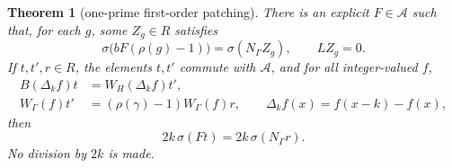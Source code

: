 \documentclass[11pt,a4paper]{article}
\newtheorem{theorem}{Theorem}[section]
\theoremstyle{definition}
\begin{document}
\begin{theorem}[one-prime first-order patching]
\label{thm:one-prime}
There is an explicit \(F\in\mathcal A\) such that,
for each \(g\), some \(Z_g\in R\) satisfies
\[
 \sigma\bigl(bF(\rho(g)-1)\bigr)
       =\sigma(N_\Gamma Z_g),\qquad LZ_g=0.
\]
If \(t,t',r\in R\), the elements \(t,t'\)
commute with \(\mathcal A\), and for all
integer-valued \(f\),
\begin{equation}\label{eq:patch-two-identities}
 \begin{split}
 B(\Delta_k f)t&=W_H(\Delta_k f)t',\\
 W_\Gamma(f)t'&=(\rho(\gamma)-1)W_\Gamma(f)r,
 \qquad \Delta_k f(x)=f(x-k)-f(x),
 \end{split}
\end{equation}
then
\[
 2k\,\sigma(Ft)=2k\,\sigma(N_\Gamma r).
\]
No division by \(2k\) is made.
\end{theorem}
\end{document}
